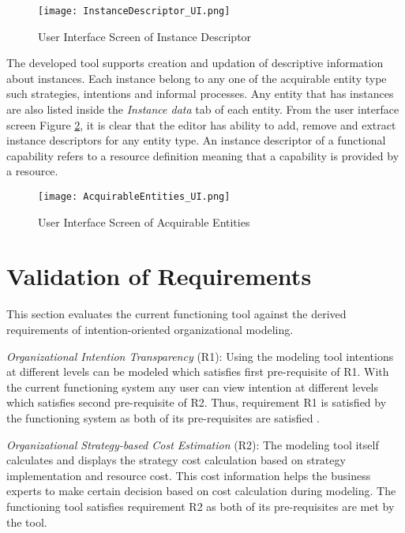 \begin{figure}
	\centering
	\texttt{[image: InstanceDescriptor\_UI.png]}
	\caption{User Interface Screen of Instance Descriptor}
	\label{fig:realizationofinstances2}
\end{figure}

The developed tool supports creation and updation of descriptive information about instances. Each instance belong to any one of the acquirable entity type such strategies, intentions and informal processes. Any entity that has instances are also listed inside the \textit{Instance data} tab of each entity. From the user interface screen Figure \ref{fig:realizationofinstances}, it is clear that the editor has ability to add, remove and extract instance descriptors for any entity type. An instance descriptor of a functional capability refers to a resource definition meaning that a capability is provided by a resource.
 
\begin{figure}
	\centering
	\texttt{[image: AcquirableEntities\_UI.png]}
	\caption{User Interface Screen of Acquirable Entities}
	\label{fig:realizationofinstances}
\end{figure}

		
\section{Validation of Requirements}
\label{sec:validation}
This section evaluates the current functioning tool against the derived requirements of intention-oriented organizational modeling. 

\textit{Organizational Intention Transparency} (R1):  Using the modeling tool intentions at different levels can be modeled which satisfies first pre-requisite of R1. With the current functioning system any user can view intention at different levels which satisfies second pre-requisite of R2. Thus, requirement R1 is satisfied by the functioning system as both of its pre-requisites are satisfied .

\textit{Organizational Strategy-based Cost Estimation} (R2): The modeling tool itself calculates and displays the strategy cost calculation based on strategy implementation and resource cost. This cost information helps the business experts to make certain decision based on cost calculation during modeling. The functioning tool satisfies requirement R2 as both of its pre-requisites are met by the tool. 

